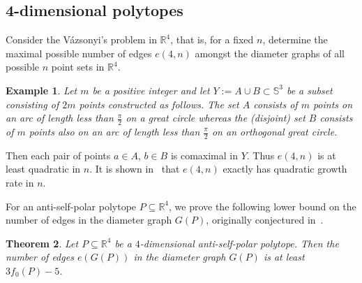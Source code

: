\documentclass[12pt]{amsart}
\theoremstyle{plain}
\newtheorem{theorem}{Theorem}[section]
\newtheorem{example}[theorem]{Example}
\newcommand{\R}{\mathbb{R}}
\newcommand{\Sp}{\mathbb{S}}
\numberwithin{equation}{section}
\begin{document}
\subsection{4-dimensional polytopes}

Consider the V\'{a}zsonyi's problem in $\R^4$, that is, for a fixed
$n$, determine the maximal possible number of edges $e(4, n)$ amongst
the diameter graphs of all possible $n$ point sets in $\R^4$.

\begin{example}
	Let $m$ be a positive integer and let  $Y := A\cup B \subset
	\Sp^3$ be a subset consisting of $2m$ points constructed as follows. The set $A$ consists of $m$ points on an
	arc of length less than $\frac{\pi}{2}$ on a great circle whereas the (disjoint) set $B$ consists of $m$ points also on an arc of length less than $\frac{\pi}{2}$ on an orthogonal
	great circle.
\end{example}



Then each pair of points $a\in A$, $b\in B$ is comaximal in $Y$.  Thus
$e(4, n)$ is at least quadratic in $n$.  It is shown
in~\cite{erdos1967some} that $e(4, n)$ exactly has quadratic growth
rate in $n$.



For an anti-self-polar polytope $P\subseteq\R^4$, we prove the
following lower bound on the number of edges in the diameter graph
$G(P)$, originally conjectured in~\cite[Section~5]{katz1989diameter}.

\begin{theorem}
\label{thm:num_edges_S_3}
Let $P\subseteq\R^4$ be a $4$-dimensional anti-self-polar polytope.
Then the number of edges $e(G(P))$ in the diameter graph $G(P)$ is
at least $3f_0(P)-5$.
\end{theorem}
\end{document}

